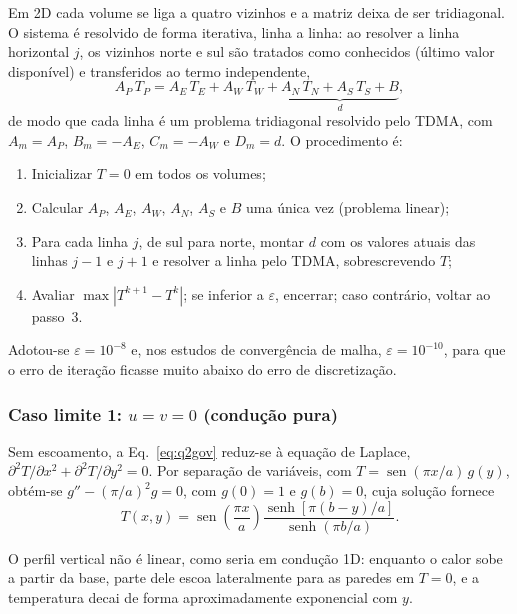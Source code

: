 Em 2D cada volume se liga a quatro vizinhos e a matriz deixa de ser
tridiagonal. O sistema é resolvido de forma iterativa, linha a linha: ao
resolver a linha horizontal $j$, os vizinhos norte e sul são tratados como
conhecidos (último valor disponível) e transferidos ao termo independente,
\[
  A_P\,T_P=A_E\,T_E+A_W\,T_W+\underbrace{A_N\,T_N+A_S\,T_S+B}_{d},
\]
de modo que cada linha é um problema tridiagonal resolvido pelo TDMA, com
$A_m=A_P$, $B_m=-A_E$, $C_m=-A_W$ e $D_m=d$. O procedimento é:

\begin{enumerate}
  \item Inicializar $T=0$ em todos os volumes;
  \item Calcular $A_P$, $A_E$, $A_W$, $A_N$, $A_S$ e $B$ uma única vez
        (problema linear);
  \item Para cada linha $j$, de sul para norte, montar $d$ com os valores
        atuais das linhas $j-1$ e $j+1$ e resolver a linha pelo TDMA,
        sobrescrevendo $T$;
  \item Avaliar $\max|T^{k+1}-T^{k}|$; se inferior a $\varepsilon$, encerrar;
        caso contrário, voltar ao passo~3.
\end{enumerate}

Adotou-se $\varepsilon=10^{-8}$ e, nos estudos de convergência de malha,
$\varepsilon=10^{-10}$, para que o erro de iteração ficasse muito abaixo do
erro de discretização.

\vspace{0.5cm}

\subsubsection*{Caso limite 1: $u=v=0$ (condução pura)}

Sem escoamento, a Eq.~\eqref{eq:q2gov} reduz-se à equação de Laplace,
$\partial^2T/\partial x^2+\partial^2T/\partial y^2=0$. Por separação de
variáveis, com $T=\operatorname{sen}(\pi x/a)\,g(y)$, obtém-se
$g''-(\pi/a)^2g=0$, com $g(0)=1$ e $g(b)=0$, cuja solução fornece
\begin{equation}
  T(x,y)=\operatorname{sen}\left(\frac{\pi x}{a}\right)
  \frac{\operatorname{senh}\left[\pi(b-y)/a\right]}{\operatorname{senh}(\pi b/a)} .
  \label{eq:q2laplace}
\end{equation}

O perfil vertical não é linear, como seria em condução 1D: enquanto o calor
sobe a partir da base, parte dele escoa lateralmente para as paredes em
$T=0$, e a temperatura decai de forma aproximadamente exponencial com $y$.

